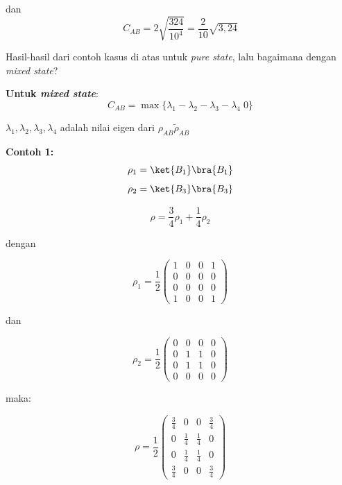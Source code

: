 \begin{enumerate}
	dan
	\begin{equation}
		C_{AB}=2\sqrt{\frac{324}{10^4}}=\frac{2}{10}\sqrt{3,24}
	\end{equation}
	
	Hasil-hasil dari contoh kasus di atas untuk \textit{pure state}, lalu bagaimana dengan \textit{mixed state}?
\end{enumerate}


\textbf{Untuk \textit{mixed state}}:
\begin{equation}
	C_{AB} = \max \{ \lambda_1 - \lambda_2 - \lambda_3 - \lambda_4 \; 0 \}
\end{equation}  

$\lambda_1, \lambda_2, \lambda_3, \lambda_4$ adalah nilai eigen  dari $\rho_{AB}\tilde{\rho}_{AB}$

\textbf{Contoh 1:}  
\begin{equation}
	\rho_1 = \ket{B_1}\bra{B_1}
\end{equation}
\begin{equation}
	\rho_2 = \ket{B_3}\bra{B_3}
\end{equation}

\begin{equation}
	\rho = \frac{3}{4}\rho_1 + \frac{1}{4}\rho_2
\end{equation}

dengan

\begin{equation}
	\rho_1 = \frac{1}{2}
	\begin{pmatrix}
		1&0&0&1\\
		0&0&0&0\\
		0&0&0&0\\
		1&0&0&1
	\end{pmatrix}
\end{equation}

dan

\begin{equation}
	\rho_2 = \frac{1}{2}
	\begin{pmatrix}
		0&0&0&0\\
		0&1&1&0\\
		0&1&1&0\\
		0&0&0&0
	\end{pmatrix}
\end{equation}

maka:  

\begin{equation}
	\rho = \frac{1}{2}
	\begin{pmatrix}
		\frac{3}{4}&0&0&\frac{3}{4}\\
		0&\frac{1}{4}&\frac{1}{4}&0\\
		0&\frac{1}{4}&\frac{1}{4}&0\\
		\frac{3}{4}&0&0&\frac{3}{4}
	\end{pmatrix}
\end{equation}

